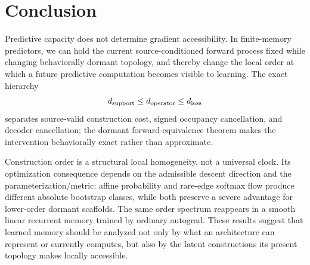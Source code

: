 \section{Conclusion}

Predictive capacity does not determine gradient accessibility. In finite-memory predictors, we can hold the current source-conditioned forward process fixed while changing behaviorally dormant topology, and thereby change the local order at which a future predictive computation becomes visible to learning. The exact hierarchy
\[
d_{\mathrm{support}}\leq d_{\mathrm{operator}}\leq d_{\mathrm{loss}}
\]
separates source-valid construction cost, signed occupancy cancellation, and decoder cancellation; the dormant forward-equivalence theorem makes the intervention behaviorally exact rather than approximate.

Construction order is a structural local homogeneity, not a universal clock. Its optimization consequence depends on the admissible descent direction and the parameterization/metric: affine probability and rare-edge softmax flow produce different absolute bootstrap classes, while both preserve a severe advantage for lower-order dormant scaffolds. The same order spectrum reappears in a smooth linear recurrent memory trained by ordinary autograd. These results suggest that learned memory should be analyzed not only by what an architecture can represent or currently computes, but also by the latent constructions its present topology makes locally accessible.
